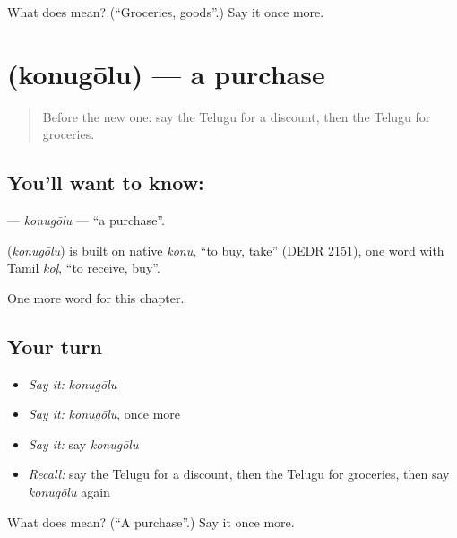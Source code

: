\begin{tcolorbox}[breakable,colback=teal!4,colframe=teal!35!black,title={Before you move on}]
What does  mean? (\textquotedblleft{}Groceries, goods\textquotedblright{}.) Say it once more.
\end{tcolorbox}
\section[\texorpdfstring{\te{కొనుగోలు} (konugōlu)}{కొనుగోలు (konugōlu)}]{ (konugōlu) — a purchase}

\label{lesson:TE-C273-konugolu}



\begin{quote}
Before the new one: say the Telugu for a discount, then the Telugu for groceries.
\end{quote}

\subsection*{You'll want to know: }
\textbf{} — \emph{konugōlu} — \textquotedblleft{}a purchase\textquotedblright{}.

\begin{cousinweb}
\textbf{} (\emph{konugōlu}) is built on native \emph{konu}, \textquotedblleft{}to buy, take\textquotedblright{} (DEDR 2151), one word with Tamil \emph{koḷ}, \textquotedblleft{}to receive, buy\textquotedblright{}.
\end{cousinweb}

\begin{grammarlens}[title={What you've built}]
One more word for this chapter.
\end{grammarlens}

\subsection*{Your turn}
\begin{itemize}
\raggedright
  \item \emph{Say it:} \emph{konugōlu}
  \item \emph{Say it:} \emph{konugōlu}, once more
  \item \emph{Say it:} say \emph{konugōlu}
  \item \emph{Recall:} say the Telugu for a discount, then the Telugu for groceries, then say \emph{konugōlu} again
\end{itemize}

\begin{tcolorbox}[breakable,colback=teal!4,colframe=teal!35!black,title={Before you move on}]
What does  mean? (\textquotedblleft{}A purchase\textquotedblright{}.) Say it once more.
\end{tcolorbox}
